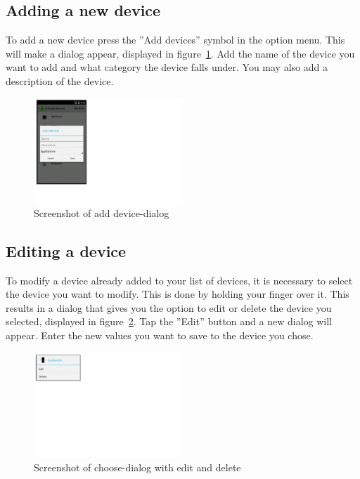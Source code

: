 \subsection{Adding a new device}
To add a new device press the ''Add devices'' symbol in the option menu. This will make a dialog appear, displayed in figure~\ref{fig:addDevice}. Add the name of the device you want to add and what category the device falls under. You may also add a description of the device.


\begin{figure}[H]
\centering
\includegraphics[width=0.5\textwidth, clip, trim=0cm 4cm 19cm 0cm]{appendix/usermanual/fig/AddDeviceDialog.png}
\caption{Screenshot of add device-dialog}
\label{fig:addDevice}
\end{figure}

\subsection{Editing a device}
To modify a device already added to your list of devices, it is necessary to select the device you want to modify. This is done by holding your finger over it. This results in a dialog that gives you the option to edit or delete the device you selected, displayed in figure~\ref{fig:editDevice}. Tap the ''Edit'' button and a new dialog will appear. Enter the new values you want to save to the device you chose.

\begin{figure}[H]
\centering
\includegraphics[width=0.5\textwidth, clip, trim=0cm 15cm 20cm 0cm]{appendix/usermanual/fig/EditDeviceDialog.png}
\caption{Screenshot of choose-dialog with edit and delete}
\label{fig:editDevice}
\end{figure}

